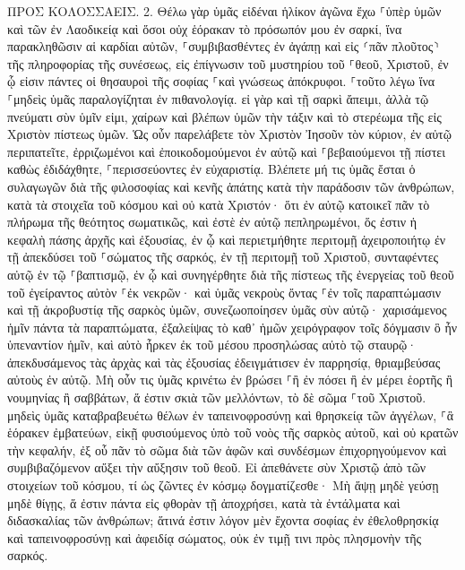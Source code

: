 \documentclass[twoside, 9pt]{extreport}
\begin{document}
ΠΡΟΣ ΚΟΛΟΣΣΑΕΙΣ.
2.
Θέλω γὰρ ὑμᾶς εἰδέναι ἡλίκον ἀγῶνα ἔχω ⸀ὑπὲρ ὑμῶν καὶ τῶν ἐν Λαοδικείᾳ καὶ ὅσοι οὐχ ἑόρακαν τὸ πρόσωπόν μου ἐν σαρκί, 
ἵνα παρακληθῶσιν αἱ καρδίαι αὐτῶν, ⸀συμβιβασθέντες ἐν ἀγάπῃ καὶ εἰς ⸂πᾶν πλοῦτος⸃ τῆς πληροφορίας τῆς συνέσεως, εἰς ἐπίγνωσιν τοῦ μυστηρίου τοῦ ⸀θεοῦ, Χριστοῦ, 
ἐν ᾧ εἰσιν πάντες οἱ θησαυροὶ τῆς σοφίας ⸀καὶ γνώσεως ἀπόκρυφοι. 
⸀τοῦτο λέγω ἵνα ⸀μηδεὶς ὑμᾶς παραλογίζηται ἐν πιθανολογίᾳ. 
εἰ γὰρ καὶ τῇ σαρκὶ ἄπειμι, ἀλλὰ τῷ πνεύματι σὺν ὑμῖν εἰμι, χαίρων καὶ βλέπων ὑμῶν τὴν τάξιν καὶ τὸ στερέωμα τῆς εἰς Χριστὸν πίστεως ὑμῶν. 
Ὡς οὖν παρελάβετε τὸν Χριστὸν Ἰησοῦν τὸν κύριον, ἐν αὐτῷ περιπατεῖτε, 
ἐρριζωμένοι καὶ ἐποικοδομούμενοι ἐν αὐτῷ καὶ ⸀βεβαιούμενοι τῇ πίστει καθὼς ἐδιδάχθητε, ⸀περισσεύοντες ἐν εὐχαριστίᾳ. 
Βλέπετε μή τις ὑμᾶς ἔσται ὁ συλαγωγῶν διὰ τῆς φιλοσοφίας καὶ κενῆς ἀπάτης κατὰ τὴν παράδοσιν τῶν ἀνθρώπων, κατὰ τὰ στοιχεῖα τοῦ κόσμου καὶ οὐ κατὰ Χριστόν· 
ὅτι ἐν αὐτῷ κατοικεῖ πᾶν τὸ πλήρωμα τῆς θεότητος σωματικῶς, 
καὶ ἐστὲ ἐν αὐτῷ πεπληρωμένοι, ὅς ἐστιν ἡ κεφαλὴ πάσης ἀρχῆς καὶ ἐξουσίας, 
ἐν ᾧ καὶ περιετμήθητε περιτομῇ ἀχειροποιήτῳ ἐν τῇ ἀπεκδύσει τοῦ ⸀σώματος τῆς σαρκός, ἐν τῇ περιτομῇ τοῦ Χριστοῦ, 
συνταφέντες αὐτῷ ἐν τῷ ⸀βαπτισμῷ, ἐν ᾧ καὶ συνηγέρθητε διὰ τῆς πίστεως τῆς ἐνεργείας τοῦ θεοῦ τοῦ ἐγείραντος αὐτὸν ⸀ἐκ νεκρῶν· 
καὶ ὑμᾶς νεκροὺς ὄντας ⸀ἐν τοῖς παραπτώμασιν καὶ τῇ ἀκροβυστίᾳ τῆς σαρκὸς ὑμῶν, συνεζωοποίησεν ὑμᾶς σὺν αὐτῷ· χαρισάμενος ἡμῖν πάντα τὰ παραπτώματα, 
ἐξαλείψας τὸ καθ᾽ ἡμῶν χειρόγραφον τοῖς δόγμασιν ὃ ἦν ὑπεναντίον ἡμῖν, καὶ αὐτὸ ἦρκεν ἐκ τοῦ μέσου προσηλώσας αὐτὸ τῷ σταυρῷ· 
ἀπεκδυσάμενος τὰς ἀρχὰς καὶ τὰς ἐξουσίας ἐδειγμάτισεν ἐν παρρησίᾳ, θριαμβεύσας αὐτοὺς ἐν αὐτῷ. 
Μὴ οὖν τις ὑμᾶς κρινέτω ἐν βρώσει ⸀ἢ ἐν πόσει ἢ ἐν μέρει ἑορτῆς ἢ νουμηνίας ἢ σαββάτων, 
ἅ ἐστιν σκιὰ τῶν μελλόντων, τὸ δὲ σῶμα ⸀τοῦ Χριστοῦ. 
μηδεὶς ὑμᾶς καταβραβευέτω θέλων ἐν ταπεινοφροσύνῃ καὶ θρησκείᾳ τῶν ἀγγέλων, ⸀ἃ ἑόρακεν ἐμβατεύων, εἰκῇ φυσιούμενος ὑπὸ τοῦ νοὸς τῆς σαρκὸς αὐτοῦ, 
καὶ οὐ κρατῶν τὴν κεφαλήν, ἐξ οὗ πᾶν τὸ σῶμα διὰ τῶν ἁφῶν καὶ συνδέσμων ἐπιχορηγούμενον καὶ συμβιβαζόμενον αὔξει τὴν αὔξησιν τοῦ θεοῦ. 
Εἰ ἀπεθάνετε σὺν Χριστῷ ἀπὸ τῶν στοιχείων τοῦ κόσμου, τί ὡς ζῶντες ἐν κόσμῳ δογματίζεσθε· 
Μὴ ἅψῃ μηδὲ γεύσῃ μηδὲ θίγῃς, 
ἅ ἐστιν πάντα εἰς φθορὰν τῇ ἀποχρήσει, κατὰ τὰ ἐντάλματα καὶ διδασκαλίας τῶν ἀνθρώπων; 
ἅτινά ἐστιν λόγον μὲν ἔχοντα σοφίας ἐν ἐθελοθρησκίᾳ καὶ ταπεινοφροσύνῃ καὶ ἀφειδίᾳ σώματος, οὐκ ἐν τιμῇ τινι πρὸς πλησμονὴν τῆς σαρκός. 
\end{document}
